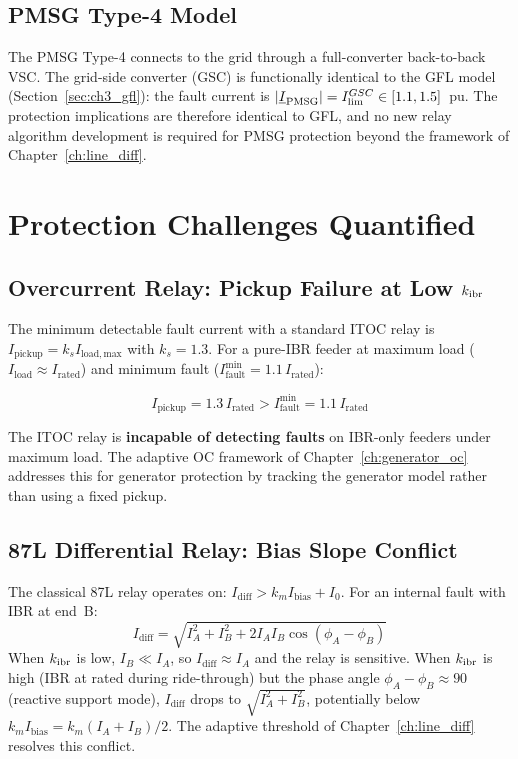 \subsection{PMSG Type-4 Model}

The PMSG Type-4 connects to the grid through a full-converter back-to-back
VSC. The grid-side converter (GSC) is functionally identical to the GFL
model (Section~\ref{sec:ch3_gfl}): the fault current is
$|\underline{I}_\mathrm{PMSG}| = I_\mathrm{lim}^{GSC} \in [1.1, 1.5]$~pu.
The protection implications are therefore identical to GFL, and no new
relay algorithm development is required for PMSG protection beyond the
framework of Chapter~\ref{ch:line_diff}.

\section{Protection Challenges Quantified}
\label{sec:ch3_challenges}

\subsection{Overcurrent Relay: Pickup Failure at Low $k_\mathrm{ibr}$}

The minimum detectable fault current with a standard ITOC relay is
$I_\mathrm{pickup} = k_s I_\mathrm{load,max}$ with $k_s = 1.3$.
For a pure-IBR feeder at maximum load ($I_\mathrm{load} \approx I_\mathrm{rated}$)
and minimum fault ($I_\mathrm{fault}^\mathrm{min} = 1.1\,I_\mathrm{rated}$):

\begin{equation}
  I_\mathrm{pickup} = 1.3\,I_\mathrm{rated} > I_\mathrm{fault}^\mathrm{min} = 1.1\,I_\mathrm{rated}
\end{equation}

The ITOC relay is \textbf{incapable of detecting faults} on IBR-only feeders
under maximum load. The adaptive OC framework of Chapter~\ref{ch:generator_oc}
addresses this for generator protection by tracking the generator model
rather than using a fixed pickup.

\subsection{87L Differential Relay: Bias Slope Conflict}

The classical 87L relay operates on:
$I_\mathrm{diff} > k_m I_\mathrm{bias} + I_0$.
For an internal fault with IBR at end~B:
\begin{equation}
  I_\mathrm{diff} = \sqrt{I_A^2 + I_B^2 + 2 I_A I_B \cos(\phi_A - \phi_B)}
\end{equation}
When $k_\mathrm{ibr}$ is low, $I_B \ll I_A$, so $I_\mathrm{diff} \approx I_A$ and the
relay is sensitive. When $k_\mathrm{ibr}$ is high (IBR at rated during ride-through)
but the phase angle $\phi_A - \phi_B \approx 90$ (reactive support mode),
$I_\mathrm{diff}$ drops to $\sqrt{I_A^2 + I_B^2}$, potentially below
$k_m I_\mathrm{bias} = k_m (I_A + I_B)/2$. The adaptive threshold of
Chapter~\ref{ch:line_diff} resolves this conflict.

